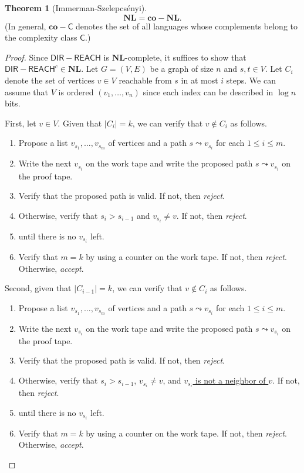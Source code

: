 \documentclass[10pt,letterpaper,cm]{nupset}
\theoremstyle{definition}
\theoremstyle{theorem}
\newtheorem{theorem}[definition]{Theorem}
\theoremstyle{remark}
\newcommand{\1}{\mathbf{1}}
\newcommand{\0}{\vec 0}
\begin{document}
\begin{theorem}[Immerman-Szelepcs\'enyi]
$$\mathbf{NL} = \mathbf{co}{-}{\mathbf{NL}}.$$ (In general, $\mathbf{co}{-}\mathsf{C}$ denotes the set of all languages whose complements belong to the complexity class $\mathsf{C}$.)
\end{theorem}
\begin{proof}
Since $\mathsf{DIR{-}REACH}$ is $\mathbf{NL}$-complete, it suffices to show that $\mathsf{DIR{-}REACH}^c\in \mathbf{NL}.$  
Let $G= \left(V, E\right)$ be a graph of size $n$ and $s, t\in V$. Let $C_i$ denote the set of vertices $v\in V$ reachable from $s$ in at most $i$ steps. We can assume that $V$ is ordered $\left(v_1, \ldots, v_n\right)$ since each index can be described in $\log{n}$ bits.

\medskip

First, let $v\in V$. Given that $\left\lvert{C_i}\right\rvert = k$, we can verify that $v \notin C_i$ as follows. 
\begin{enumerate}
\item Propose a list $v_{s_1}, \ldots, v_{s_m}$ of vertices and a path $s\leadsto v_{s_i}$ for each $1\leq i \leq m$. 
\item Write the next $v_{s_i}$ on the work tape and write the proposed path $s \leadsto v_{s_i}$ on the proof tape. 
\item Verify that the proposed path is valid. If not, then \textit{reject}.
\item Otherwise, verify that $s_i > s_{i-1}$ and $v_{s_i} \ne v$. If not, then \textit{reject}. 
\item {} until there is no $v_{s_i}$ left. 
\item Verify that $m = k$ by using a counter on the work tape. If not, then \textit{reject}. Otherwise, \textit{accept}.
\end{enumerate}

\smallskip

Second, given that $\left\lvert{C_{i-1}}\right\rvert = k$,  we can verify that $v\notin C_i$ as follows.
\begin{enumerate}
\item Propose a list $v_{s_1}, \ldots, v_{s_m}$ of vertices and a path $s\leadsto v_{s_i}$ for each $1\leq i \leq m$. 
\item Write the next $v_{s_i}$ on the work tape and write the proposed path $s \leadsto v_{s_i}$ on the proof tape. 
\item Verify that the proposed path is valid. If not, then \textit{reject}.
\item Otherwise, verify that $s_i > s_{i-1}$, $v_{s_i} \ne v$, and \underline{$v_{s_i}$ is not a neighbor of $v$}. If not, then \textit{reject}. 
\item {} until there is no $v_{s_i}$ left. 
\item Verify that $m = k$ by using a counter on the work tape. If not, then \textit{reject}. Otherwise, \textit{accept}.
\end{enumerate}


\end{proof}
\end{document}
